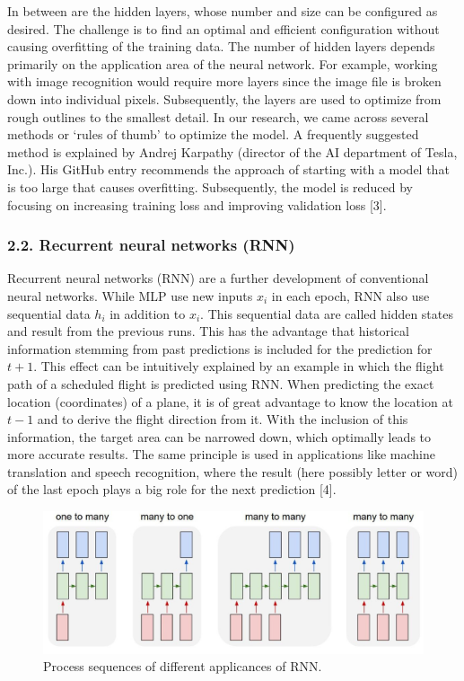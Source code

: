 \documentclass[
]{article}
\begin{document}
In between are the hidden layers, whose number and size can be
configured as desired. The challenge is to find an optimal and efficient
configuration without causing overfitting of the training data. The
number of hidden layers depends primarily on the application area of the
neural network. For example, working with image recognition would
require more layers since the image file is broken down into individual
pixels. Subsequently, the layers are used to optimize from rough
outlines to the smallest detail. In our research, we came across several
methods or `rules of thumb' to optimize the model. A frequently
suggested method is explained by Andrej Karpathy (director of the AI
department of Tesla, Inc.). His GitHub entry recommends the approach of
starting with a model that is too large that causes overfitting.
Subsequently, the model is reduced by focusing on increasing training
loss and improving validation loss {[}3{]}.

\hypertarget{RNN}{%
\subsubsection{2.2. Recurrent neural networks (RNN)}\label{RNN}}

Recurrent neural networks (RNN) are a further development of
conventional neural networks. While MLP use new inputs \(x_i\) in each
epoch, RNN also use sequential data \(h_i\) in addition to \(x_i\). This
sequential data are called hidden states and result from the previous
runs. This has the advantage that historical information stemming from
past predictions is included for the prediction for \(t+1\). This effect
can be intuitively explained by an example in which the flight path of a
scheduled flight is predicted using RNN. When predicting the exact
location (coordinates) of a plane, it is of great advantage to know the
location at \(t-1\) and to derive the flight direction from it. With the
inclusion of this information, the target area can be narrowed down,
which optimally leads to more accurate results. The same principle is
used in applications like machine translation and speech recognition,
where the result (here possibly letter or word) of the last epoch plays
a big role for the next prediction {[}4{]}.

\begin{figure}

{\centering \includegraphics[width=0.8\linewidth]{images/RNN} 

}

\caption{Process sequences of different applicances of RNN.}\label{fig:RNN}
\end{figure}
\end{document}
